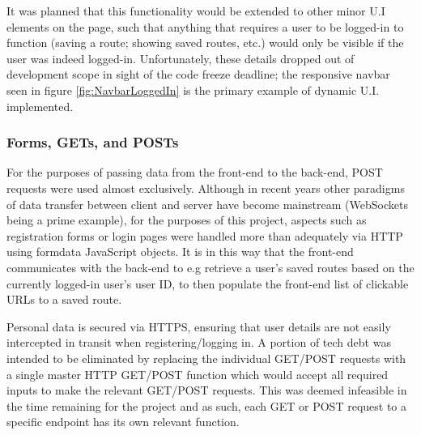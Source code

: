 \documentclass[]{UCD_CS_47360_Report}
\begin{document}
It was planned that this functionality would be extended to other minor U.I elements on the page, such that anything that requires a user to be logged-in to function (saving a route; showing saved routes, etc.) would only be visible if the user was indeed logged-in. Unfortunately, these details dropped out of development scope in sight of the code freeze deadline; the responsive navbar seen in figure \ref{fig:NavbarLoggedIn} is the primary example of dynamic U.I. implemented.


\subsubsection{Forms, GETs, and POSTs}
For the purposes of passing data from the front-end to the back-end, POST requests were used almost exclusively. Although in recent years other paradigms of data transfer between client and server have become mainstream (WebSockets being a prime example), for the purposes of this project, aspects such as registration forms or login pages were handled more than adequately via HTTP using formdata JavaScript objects. It is in this way that the front-end communicates with the back-end to e.g retrieve a user's saved routes based on the currently logged-in user's user ID, to then populate the front-end list of clickable URLs to a saved route.


Personal data is secured via HTTPS, ensuring that user details are not easily intercepted in transit when registering/logging in.
A portion of tech debt was intended to be eliminated by replacing the individual GET/POST requests with a single master HTTP GET/POST function which would accept all required inputs to make the relevant GET/POST requests. This was deemed infeasible in the time remaining for the project and as such, each GET or POST request to a specific endpoint has its own relevant function.
\end{document}
